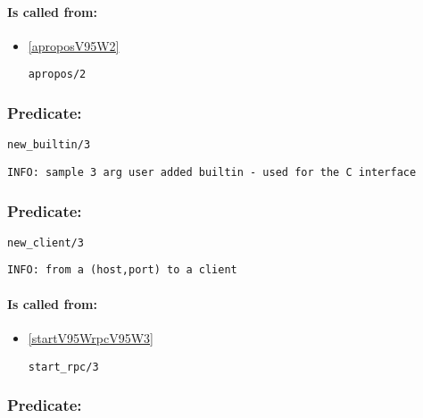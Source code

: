 \paragraph{Is called from:} 
\begin{itemize}
\item \ref{aproposV95W2} 
\begin{verbatim}
apropos/2
\end{verbatim}

\end{itemize}

\subsubsection{Predicate:} \label{newV95WbuiltinV95W3}

\begin{verbatim}
new_builtin/3
\end{verbatim}

{\small \begin{verbatim}
INFO: sample 3 arg user added builtin - used for the C interface

\end{verbatim}}

\subsubsection{Predicate:} \label{newV95WclientV95W3}

\begin{verbatim}
new_client/3
\end{verbatim}

{\small \begin{verbatim}
INFO: from a (host,port) to a client

\end{verbatim}}
\paragraph{Is called from:} 
\begin{itemize}
\item \ref{startV95WrpcV95W3} 
\begin{verbatim}
start_rpc/3
\end{verbatim}

\end{itemize}

\subsubsection{Predicate:} \label{newV95WengineV95W3}

